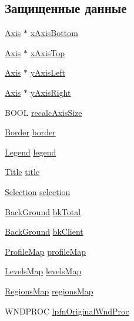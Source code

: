 \subsection*{Защищенные данные}
\begin{DoxyCompactItemize}
\item 
\hyperlink{class_axis}{Axis} $\ast$ \hyperlink{class_x_y_plot_a2ab7607dd67094563d56ace4fd2048f5}{x\-Axis\-Bottom}
\item 
\hyperlink{class_axis}{Axis} $\ast$ \hyperlink{class_x_y_plot_ac1ea69a1108f0f7a257bad3f8699f23d}{x\-Axis\-Top}
\item 
\hyperlink{class_axis}{Axis} $\ast$ \hyperlink{class_x_y_plot_a84d59c9f1ba75f0e02e70ad283c447d6}{y\-Axis\-Left}
\item 
\hyperlink{class_axis}{Axis} $\ast$ \hyperlink{class_x_y_plot_ac2273b77f7ff75d44b84da348ccbc9db}{y\-Axis\-Right}
\item 
B\-O\-O\-L \hyperlink{class_x_y_plot_ab839ff226353ebe8be5836f362996769}{recalc\-Axis\-Size}
\item 
\hyperlink{class_border}{Border} \hyperlink{class_x_y_plot_a0d15dd8faf7aac3b2f0f02e6a45ebbdf}{border}
\item 
\hyperlink{class_legend}{Legend} \hyperlink{class_x_y_plot_ab86c3fe630fa3957ac53d42a5b4006fd}{legend}
\item 
\hyperlink{class_title}{Title} \hyperlink{class_x_y_plot_ae9f6dcfa882433683585a55edbc2d6fb}{title}
\item 
\hyperlink{class_selection}{Selection} \hyperlink{class_x_y_plot_a35a92ce3e3edab77299ddc6814cae835}{selection}
\item 
\hyperlink{class_back_ground}{Back\-Ground} \hyperlink{class_x_y_plot_a66e7aeb6818a5fcf8fa2b51c95462a96}{bk\-Total}
\item 
\hyperlink{class_back_ground}{Back\-Ground} \hyperlink{class_x_y_plot_a0324b90dc9b73455e1346e6dde3b2db0}{bk\-Client}
\item 
\hyperlink{profile_8h_a19285e49c540d09517740fab4252f854}{Profile\-Map} \hyperlink{class_x_y_plot_aa8e990063268b42ae21efb5596183235}{profile\-Map}
\item 
\hyperlink{_level_line_8h_a3cdadb601712f2009c6ebd422232d17e}{Levels\-Map} \hyperlink{class_x_y_plot_aa5ef2fe78df60b9b25f37c078d77c797}{levels\-Map}
\item 
\hyperlink{_regions_8h_a75ca559f3ba2ddf617b9c211afcdd941}{Regions\-Map} \hyperlink{class_x_y_plot_acd2662c65214f871c75b14fe796052b5}{regions\-Map}
\item 
W\-N\-D\-P\-R\-O\-C \hyperlink{class_x_y_plot_a2a0a2644e069cc2fb2df6c6463f804aa}{lpfn\-Original\-Wnd\-Proc}

\end{DoxyCompactItemize}

